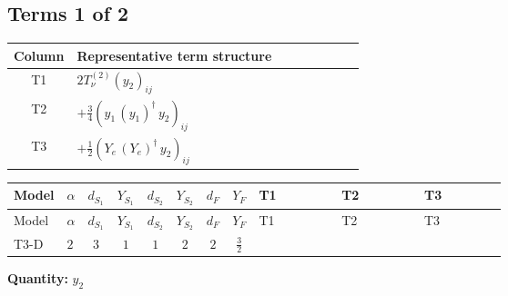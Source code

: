 \documentclass[8pt]{article}
\begin{document}
\begin{landscape}
\subsection*{Terms 1 of 2}
\begin{center}
\begin{tabular}{@{}c >{\raggedright\arraybackslash}p{0.82\linewidth}@{}}
\toprule
Column & Representative term structure \\
\midrule
T1 & \(\displaystyle 2 T_{\nu}^{(2)} \left({y_2}\right)_{ij}\) \\
\midrule
T2 & \(\displaystyle +\frac{3}{4} \left({y_1}\,\left({y_1}\right)^{\dagger}\,{y_2}\right)_{ij}\) \\
\midrule
T3 & \(\displaystyle +\frac{1}{2} \left({Y_e}\,\left({Y_e}\right)^{\dagger}\,{y_2}\right)_{ij}\) \\
\midrule
\bottomrule
\end{tabular}
\end{center}
\smallskip
\tiny
\begin{longtable}{@{}llcccccc >{\raggedright\arraybackslash}p{0.21\linewidth} >{\raggedright\arraybackslash}p{0.21\linewidth} >{\raggedright\arraybackslash}p{0.21\linewidth}@{}}
\toprule
Model & $\alpha$ & $d_{S_1}$ & $Y_{S_1}$ & $d_{S_2}$ & $Y_{S_2}$ & $d_F$ & $Y_F$ & T1 & T2 & T3 \\
\midrule
\endfirsthead
\toprule
Model & $\alpha$ & $d_{S_1}$ & $Y_{S_1}$ & $d_{S_2}$ & $Y_{S_2}$ & $d_F$ & $Y_F$ & T1 & T2 & T3 \\
\midrule
\endhead
T3-D & $2$ & $3$ & $1$ & $1$ & $2$ & $2$ & $\frac{3}{2}$ & \scriptsize\adjustbox{max width=\linewidth}{$\begin{gathered} 2 T_{\nu}^{(2)} \left({y_2}\right)_{ij}\end{gathered}$} & \scriptsize\adjustbox{max width=\linewidth}{$\begin{gathered} +\frac{3}{4} \left({y_1}\,\left({y_1}\right)^{\dagger}\,{y_2}\right)_{ij}\end{gathered}$} & \scriptsize\adjustbox{max width=\linewidth}{$\begin{gathered} +\frac{1}{2} \left({Y_e}\,\left({Y_e}\right)^{\dagger}\,{y_2}\right)_{ij}\end{gathered}$} \\
\midrule
\bottomrule
\end{longtable}
\clearpage
\noindent\textbf{Quantity: }$y_2$\par\smallskip

\end{landscape}
\end{document}

